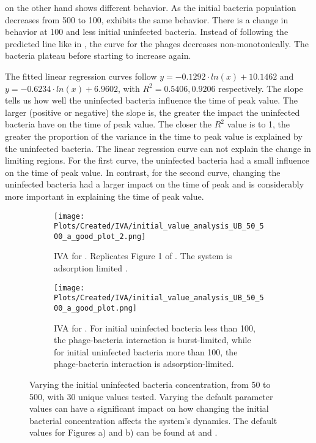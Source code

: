  on the other hand shows different behavior. 
As the initial bacteria population decreases from 500 to 100,  exhibits the same behavior. 
There is a change in behavior at 100 and less initial uninfected bacteria. 
Instead of following the predicted line like in , the curve for the phages decreases non-monotonically.
The bacteria plateau before starting to increase again. 

The fitted linear regression curves follow $y = -0.1292\cdot ln(x) + 10.1462$ and $y = -0.6234\cdot ln(x)+6.9602$, with $R^2=0.5406, 0.9206$ respectively. 
The slope tells us how well the uninfected bacteria influence the time of peak value. 
The larger (positive or negative) the slope is, the greater the impact the uninfected bacteria have on the time of peak value. 
The closer the $R^2$ value is to 1, the greater the proportion of the variance in the time to peak value is explained by the uninfected bacteria. 
The linear regression curve can not explain the change in limiting regions. 
For the first curve, the uninfected bacteria had a small influence on the time of peak value. In contrast, for the second curve, changing the uninfected bacteria had a larger impact on the time of peak and is considerably more important in explaining the time of peak value. 

\begin{figure}
    \centering
    \begin{subfigure}{1\linewidth}
        \centering
        \texttt{[image: Plots/Created/IVA/initial\_value\_analysis\_UB\_50\_500\_a\_good\_plot\_2.png]}
        \caption{
            IVA for . 
            Replicates Figure 1 of \citet{mullaExtremeDiversityPhage2024}. 
            The system is adsorption limited \cite{mullaExtremeDiversityPhage2024}. 
        }
        \label{fig:created:initial_value_analysis_UB_50_500_a_good_plot_2}
    \end{subfigure}
    \hfill
    \begin{subfigure}{1\linewidth}
        \centering
        \texttt{[image: Plots/Created/IVA/initial\_value\_analysis\_UB\_50\_500\_a\_good\_plot.png]}
        \caption{
            IVA for . 
            For initial uninfected bacteria less than 100, the phage-bacteria interaction is burst-limited, while for initial uninfected bacteria more than 100, the phage-bacteria interaction is adsorption-limited. 
        }
        \label{fig:created:initial_value_analysis_UB_50_500_a_good_plot}
    \end{subfigure}
    \caption{
        Varying the initial uninfected bacteria concentration, from 50 to 500, with 30 unique values tested. 
        Varying the default parameter values can have a significant impact on how changing the initial bacterial concentration affects the system's dynamics. 
        The default values for Figures a) and b) can be found at  and . 
    }
\end{figure}

